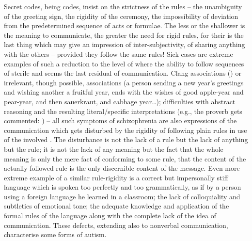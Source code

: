 Secret codes, being codes, insist on the strictness of the rules -- the
unambiguity of the greeting sign, the rigidity of the ceremony, the
impossibility of deviation from the predetermined sequence of acts or
formulae. The less or the shallower is
the meaning to communicate, the greater the need for rigid rules, for their
 is the last thing which may give an impression of
inter-subjectivity, of sharing anything with the others -- provided they follow
the same rules!  Sick cases are extreme examples of such a reduction to the
level of  where the ability to follow sequences of sterile
and  seems the last residual of communication.  Clang
associations () or irrelevant, though possible,
associations (a person sending a new year's greetings and wishing another a
fruitful year, ends with the wishes of good apple-year and pear-year, and then
sauerkraut, and cabbage year\ldots); difficulties with abstract reasoning and the
resulting literal/specific interpretations (e.g., the proverb  gets commented: ) -- all such symptoms of
schizophrenia are also expressions of the communication which gets disturbed by
the rigidity of following plain rules in use of the involved
.  The disturbance is not the lack
of a rule but the lack of 
anything but the rule; it is not the lack of any meaning but the fact that the
whole meaning is only the mere fact of conforming to some rule, that the content
of the actually followed rule is the only discernible content of the message.
Even more extreme example of a similar rule-rigidity is a correct but
impersonally stiff language which is spoken too perfectly and too grammatically,
as if by a person using a foreign language he learned in a classroom; the lack
of colloquiality and subtleties of emotional tone; the adequate knowledge and
application of the formal rules of the language along with the complete lack of
the idea of communication. These defects, extending also to nonverbal
communication, characterise some forms of autism.


